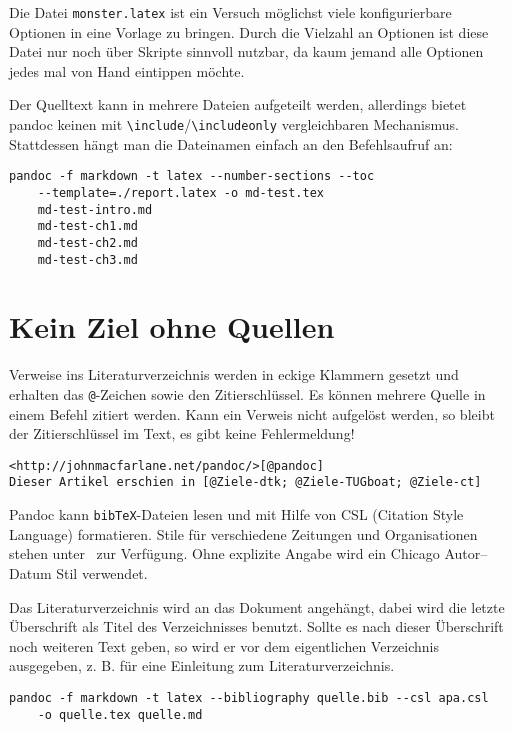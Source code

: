 \documentclass[11pt,ngerman,a4paper]{article}
\begin{document}
Die Datei \texttt{monster.latex} ist ein Versuch möglichst viele
konfigurierbare Optionen in eine Vorlage zu bringen. Durch die Vielzahl
an Optionen ist diese Datei nur noch über Skripte sinnvoll nutzbar, da
kaum jemand alle Optionen jedes mal von Hand eintippen möchte.

Der Quelltext kann in mehrere Dateien aufgeteilt werden, allerdings
bietet pandoc keinen mit
\texttt{\textbackslash{}include}/\texttt{\textbackslash{}includeonly}
vergleichbaren Mechanismus. Stattdessen hängt man die Dateinamen einfach
an den Befehlsaufruf an:

\begin{verbatim}
pandoc -f markdown -t latex --number-sections --toc 
    --template=./report.latex -o md-test.tex 
    md-test-intro.md 
    md-test-ch1.md 
    md-test-ch2.md 
    md-test-ch3.md
\end{verbatim}

\section{Kein Ziel ohne Quellen}\label{kein-ziel-ohne-quellen}

Verweise ins Literaturverzeichnis werden in eckige Klammern gesetzt und
erhalten das \texttt{@}-Zeichen sowie den Zitierschlüssel. Es können
mehrere Quelle in einem Befehl zitiert werden. Kann ein Verweis nicht
aufgelöst werden, so bleibt der Zitierschlüssel im Text, es gibt keine
Fehlermeldung!

\begin{verbatim}
<http://johnmacfarlane.net/pandoc/>[@pandoc]
Dieser Artikel erschien in [@Ziele-dtk; @Ziele-TUGboat; @Ziele-ct]
\end{verbatim}

Pandoc kann \texttt{bibTeX}-Dateien lesen und mit Hilfe von CSL
(Citation Style Language) formatieren. Stile für verschiedene Zeitungen
und Organisationen stehen unter~\autocite{csl} zur Verfügung. Ohne
explizite Angabe wird ein Chicago Autor--Datum Stil verwendet.

Das Literaturverzeichnis wird an das Dokument angehängt, dabei wird die
letzte Überschrift als Titel des Verzeichnisses benutzt. Sollte es nach
dieser Überschrift noch weiteren Text geben, so wird er vor dem
eigentlichen Verzeichnis ausgegeben, z. B. für eine Einleitung zum
Literaturverzeichnis.

\begin{verbatim}
pandoc -f markdown -t latex --bibliography quelle.bib --csl apa.csl 
    -o quelle.tex quelle.md
\end{verbatim}
\end{document}
